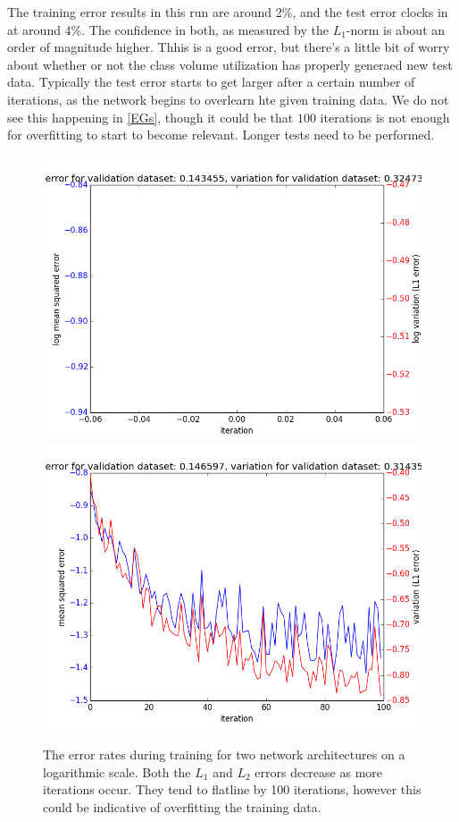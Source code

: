 \documentclass[prl,amsmath,amssymb,floatfix,superscriptaddress,notitlepage,twocolumn]{revtex4}
\begin{document}
The training error results in this run are around 2\%, and the test error clocks in at around 4\%. The confidence in both, as measured by the $L_1$-norm is about an order of magnitude higher. Thhis is a good error, but there's a little bit of worry about whether or not the class volume utilization has properly generaed new test data. Typically the test error starts to get larger after a certain number of iterations, as the network begins to overlearn hte given training data. We do not see this happening in \ref{EGs}, though it could be that $100$ iterations is not enough for overfitting to start to become relevant. Longer tests need to be performed.

 

\begin{figure}[ht!]
\label{EG1}
\centering
\includegraphics[width=.48\textwidth]{error-4layer-48-96.png}\hspace{.2 cm}
\includegraphics[width=.48\textwidth]{error-5layer-48-3-48.png}
\caption{The error rates during training for two network architectures on a logarithmic scale. Both the $L_1$ and $L_2$ errors decrease as more iterations occur. They tend to flatline by 100 iterations, however this could be indicative of overfitting the training data. }
\end{figure}
\end{document}
